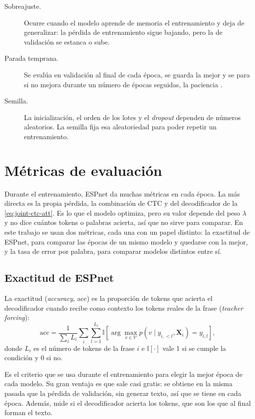 \begin{description}
  \item[Sobreajuste.] Ocurre cuando el modelo aprende de memoria el entrenamiento y deja de generalizar: la pérdida de entrenamiento sigue bajando, pero la de validación se estanca o sube.

  \item[Parada temprana.] Se evalúa en validación al final de cada época, se guarda la mejor y se para si no mejora durante un número de épocas seguidas, la paciencia \cite{prechelt1998early}.

  \item[Semilla.] La inicialización, el orden de los lotes y el \textit{dropout} dependen de números aleatorios. La semilla fija esa aleatoriedad para poder repetir un entrenamiento.
\end{description}

\section{Métricas de evaluación}
\label{sec:metricas-teoria}

Durante el entrenamiento, ESPnet da muchas métricas en cada época. La más directa es la propia pérdida, la combinación de CTC y del decodificador de la \cref{eq:joint-ctc-att}. Es lo que el modelo optimiza, pero su valor depende del peso $\lambda$ y no dice cuántos tokens o palabras acierta, así que no sirve para comparar. En este trabajo se usan dos métricas, cada una con un papel distinto: la exactitud de ESPnet, para comparar las épocas de un mismo modelo y quedarse con la mejor, y la tasa de error por palabra, para comparar modelos distintos entre sí.

\subsection{Exactitud de ESPnet}

La exactitud (\textit{accuracy}, acc) es la proporción de tokens que acierta el decodificador cuando recibe como contexto los tokens reales de la frase (\textit{teacher forcing}):
\begin{equation}
  \mathrm{acc} = \frac{1}{\sum_i L_i} \sum_{i} \sum_{l=1}^{L_i} \mathbb{I}\!\left[ \arg\max_{v \in \mathcal{V}} p(v \mid y_{i,<l}, \mathbf{X}_i) = y_{i,l} \right],
  \label{eq:acc}
\end{equation}
donde $L_i$ es el número de tokens de la frase $i$ e $\mathbb{I}[\cdot]$ vale 1 si se cumple la condición y 0 si no.

Es el criterio que se usa durante el entrenamiento para elegir la mejor época de cada modelo. Su gran ventaja es que sale casi gratis: se obtiene en la misma pasada que la pérdida de validación, sin generar texto, así que se tiene en cada época. Además, mide si el decodificador acierta los tokens, que son los que al final forman el texto.

